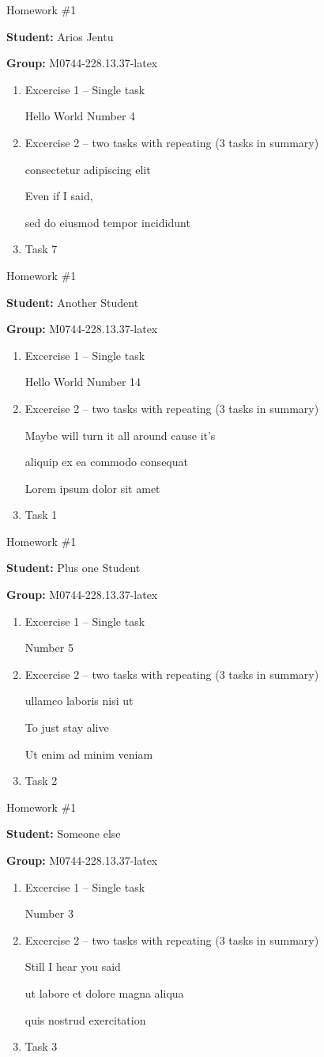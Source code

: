 \documentclass[12pt, fleqn, a4paper]{article}
\newcommand{\preamble}{\lipsum[1]}
\newcommand{\generatepage}[4]{
	\begin{center}
		{\Large #1}

		\textbf{Student:} #2

		\textbf{Group:} #3

	\end{center}

	\vspace{10pt}

	\preamble

	\begin{enumerate}
		#4
	\end{enumerate}

	\pagebreak
}
\begin{document}
	
	\generatepage{Homework \#1}{Arios Jentu}{M0744-228.13.37-latex}{
		\item Excercise 1 -- Single task

			Hello World Number 4
		\item Excercise 2 -- two tasks with repeating (3 tasks in summary)

			consectetur adipiscing elit

			Even if I said,

			sed do eiusmod tempor incididunt 
		\item 

			Task 7
	}

	\generatepage{Homework \#1}{Another Student}{M0744-228.13.37-latex}{
		\item Excercise 1 -- Single task

			Hello World Number 14
		\item Excercise 2 -- two tasks with repeating (3 tasks in summary)

			Maybe will turn it all around cause it's

			aliquip ex ea commodo consequat

			Lorem ipsum dolor sit amet
		\item 

			Task 1
	}

	\generatepage{Homework \#1}{Plus one Student}{M0744-228.13.37-latex}{
		\item Excercise 1 -- Single task

			Number 5
		\item Excercise 2 -- two tasks with repeating (3 tasks in summary)

			ullamco laboris nisi ut 

			To just stay alive

			Ut enim ad minim veniam
		\item 

			Task 2
	}

	\generatepage{Homework \#1}{Someone else}{M0744-228.13.37-latex}{
		\item Excercise 1 -- Single task

			Number 3
		\item Excercise 2 -- two tasks with repeating (3 tasks in summary)

			Still I hear you said

			ut labore et dolore magna aliqua 

			quis nostrud exercitation 
		\item 

			Task 3
	}
\end{document}
